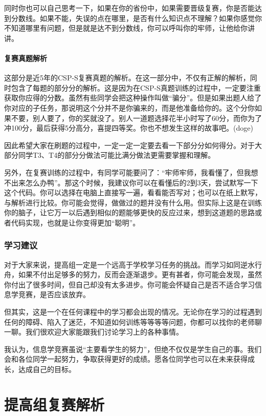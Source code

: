 \documentclass{book}
\begin{document}
同时你也可以自己思考一下，如果在你的省份中，如果需要晋级复赛，你是否能达到分数线。如果不能，失误的点在哪里，是否有什么知识点不理解？如果你感觉你不知道哪里有问题，但是就是达不到分数线，你可以呼叫你的牢师，让他给你讲讲。
\subsection{复赛真题解析}
    这部分是近5年的CSP-S复赛真题的解析。在这一部分中，不仅有正解的解析，同时包含了每题的部分分的解析。这是因为在CSP-S真题训练的过程中，一定要注重获取你应得的分数。虽然有些同学会把这种操作叫做“骗分”。但是如果出题人给了你对应的子任务，那说明这个分并不是你骗来的，而是他准备给你的。这个分你如果不要，别人要了，你的奖就没了。别人一道题选择花半小时写了60分，而你为了冲100分，最后获得5分高分，喜提四等奖。你也不想发生这样的故事吧。(doge)
    
因此希望大家在刷题的过程中，一定一定一定要去看一下部分分如何得分。对于大部分同学T3、T4的部分分做法可能比满分做法更需要掌握和理解。

另外，在复赛训练的过程中，有同学可能要问了：“牢师牢师，我看懂了，但我想不出来怎么办鸭”。那这个时候，我建议你可以在看懂后的2到3天，尝试默写一下这个代码。你可以选择在电脑上直接写一遍，看看能否写对；也可以在纸上默写，与解析进行比较。你可能会觉得，做做过的题并没有什么用。但实际上这是在训练你的脑子，让它万一以后遇到相似的题能够更快的反应过来，想到这道题的思路或者代码实现，也就是让你变得更加“聪明”。

\section*{学习建议}

    对于大家来说，提高组一定是一个远高于学校学习任务的挑战。而学习如同逆水行舟，如果不付出足够多的努力，反而会逐渐退步。更有甚者，你可能会发现，虽然你付出了很多时间，但自己却没有太多进步。你可能会怀疑自己是否不适合学习信息学竞赛，是否应该放弃。
    
但其实，这是一个在任何课程中的学习都会出现的情况。无论你在学习的过程遇到任何的障碍、陷入了迷茫，不知道如何训练等等等等问题，你都可以找你的老师聊一聊。我们很欢迎大家能跟我们讨论学习上的各种事情。

我认为，信息学竞赛虽说“主要看学生的努力”，但绝不仅仅是学生自己的事。我们会和各位同学一起努力，争取获得更好的成绩。愿各位同学也可以在未来获得成长，达成自己的目标。


\tableofcontents

\mainmatter

\part{提高组复赛解析}
\end{document}
